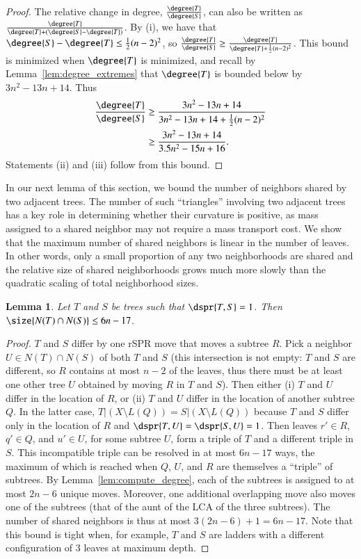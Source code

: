 \documentclass[]{elsarticle}
\newtheorem{lem}[thm]{Lemma}
\begin{document}
\begin{proof}
The relative change in degree, $\frac{\degree{T}}{\degree{S}}$, can also be written as $\frac{\degree{T}}{\degree{T} + (\degree{S} - \degree{T})}$.
By (i), we have that $\degree{S} - \degree{T} \le \frac{1}{2} (n-2)^2$,
so $\frac{\degree{T}}{\degree{S}} \ge \frac{\degree{T}}{\degree{T} + \frac{1}{2} (n-2)^2} $.
This bound is minimized when $\degree{T}$ is minimized, and recall by Lemma~\ref{lem:degree_extremes} that $\degree{T}$ is bounded below by $3n^2 - 13n + 14$.
	Thus
	\begin{align*}
		\frac{\degree{T}}{\degree{S}} &\ge \frac{3n^2 - 13n + 14}{3n^2 - 13n + 14 + \frac{1}{2}(n-2)^2} \\
		&\ge \frac{3n^2 - 13n + 14}{3.5n^2 - 15n + 16}.
	\end{align*}
	Statements (ii) and (iii) follow from this bound.

\end{proof}


In our next lemma of this section, we bound the number of neighbors shared by two adjacent trees.
The number of such ``triangles'' involving two adjacent trees has a key role in determining whether their curvature is positive, as mass assigned to a shared neighbor may not require a mass transport cost.
We show that the maximum number of shared neighbors is linear in the number of leaves.
In other words, only a small proportion of any two neighborhoods are shared and the relative size of shared neighborhoods grows much more slowly than the quadratic scaling of total neighborhood sizes.

\begin{lem}
	\label{lem:shared_neighbors}
Let $T$ and $S$ be trees such that $\dspr{T,S} = 1$.
Then $\size{N(T) \cap N(S)} \le 6n - 17$.
\end{lem}
\begin{proof}
	$T$ and $S$ differ by one rSPR move that moves a subtree $R$.
	Pick a neighbor $U \in N(T) \cap N(S)$ of both $T$ and $S$ (this intersection is not empty: $T$ and $S$ are different, so $R$ contains at most $n-2$ of the leaves, thus there must be at least one other tree $U$ obtained by moving $R$ in $T$ and $S$).
	Then either (i) $T$ and $U$ differ in the location of $R$, or (ii) $T$ and $U$ differ in the location of another subtree $Q$.
	In the latter case, $T|(X \setminus L(Q)) = S|(X \setminus L(Q))$ because $T$ and $S$ differ only in the location of $R$ and $\dspr{T,U} = \dspr{S,U} = 1$.
	Then leaves $r' \in R$, $q' \in Q$, and $u' \in U$, for some subtree $U$, form a triple of $T$ and a different triple in $S$.
	This incompatible triple can be resolved in at most $6n - 17$ ways, the maximum of which is reached when $Q$, $U$, and $R$ are themselves a ``triple'' of subtrees.
	By Lemma~\ref{lem:compute_degree}, each of the subtrees is assigned to at most $2n-6$ unique moves.
	Moreover, one additional overlapping move also moves one of the subtrees (that of the aunt of the LCA of the three subtrees).
	The number of shared neighbors is thus at most $3(2n-6) + 1 = 6n-17$.
	Note that this bound is tight when, for example, $T$ and $S$ are ladders with a different configuration of 3 leaves at maximum depth.
\end{proof}
\end{document}
